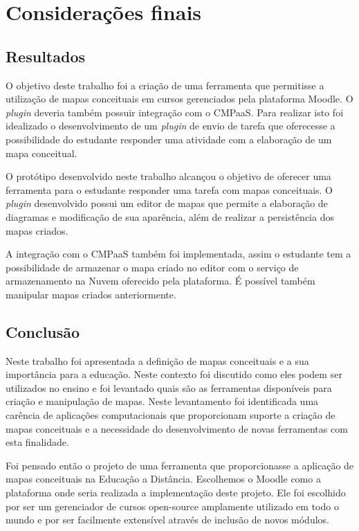 \documentclass[
	12pt,				%
	openright,			%
	oneside,			%
	a4paper,			%
	english,			%
	french,				%
	spanish,			%
	brazil				%
	]{abntex2}
\begin{document}
\chapter{Considerações finais}

\section{Resultados}

O objetivo deste trabalho foi a criação de uma ferramenta que permitisse a utilização de mapas conceituais em cursos gerenciados pela plataforma Moodle. O \textit{plugin}  deveria também possuir integração com o CMPaaS. Para realizar isto foi idealizado o desenvolvimento de um \textit{plugin} de envio de tarefa que oferecesse a possibilidade do estudante responder uma atividade com a elaboração de um mapa conceitual.

O protótipo desenvolvido neste trabalho alcançou o objetivo de oferecer uma ferramenta para o estudante responder uma tarefa com mapas conceituais. O \textit{plugin} desenvolvido possui um editor de mapas que permite a elaboração de diagramas e modificação de sua aparência, além de realizar a persistência dos mapas criados. 

A integração com o CMPaaS também foi implementada, assim o estudante tem a possibilidade de armazenar o mapa criado no editor com o serviço de armazenamento na Nuvem oferecido pela plataforma. É possível também manipular mapas criados anteriormente. 



\section{Conclusão}

Neste trabalho foi apresentada a definição de mapas conceituais e a sua importância para a educação. Neste contexto foi discutido como eles podem ser utilizados no ensino e foi levantado quais são as ferramentas disponíveis para criação e manipulação de mapas. Neste levantamento foi identificada uma carência de aplicações computacionais que proporcionam suporte a criação de mapas conceituais e a necessidade do desenvolvimento de novas ferramentas com esta finalidade.

Foi pensado então o projeto de uma ferramenta que proporcionasse a aplicação de mapas conceituais na Educação a Distância. Escolhemos o Moodle como a plataforma onde seria realizada a implementação deste projeto. Ele foi escolhido por ser um gerenciador de cursos open-source amplamente utilizado em todo o mundo e por ser facilmente extensível através de inclusão de novos módulos.
\end{document}

